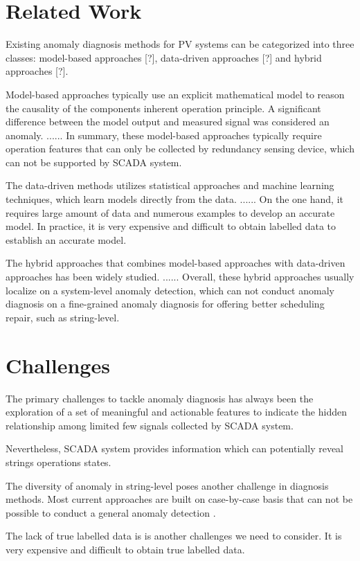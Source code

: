 \documentclass[journal]{IEEEtran}
\begin{document}
\section{Related Work}
\label{sctn:related}
Existing anomaly diagnosis methods for PV systems can be categorized into three classes: model-based approaches [?], data-driven approaches [?] and hybrid approaches [?].

Model-based approaches typically use an explicit mathematical model to reason the causality of the components inherent operation principle. A significant difference between the model output and measured signal was considered an anomaly. ...... In summary, these model-based approaches typically require operation features that can only be collected by redundancy sensing device, which can not be supported by SCADA system.

The data-driven methods utilizes statistical approaches and machine learning techniques, which learn models directly from the data. ...... On the one hand, it requires large amount of data and numerous examples to develop an accurate model. In practice, it is very expensive and difficult to obtain labelled data to establish an accurate model.

The hybrid approaches that combines model-based approaches with data-driven approaches has been widely studied. ...... Overall, these hybrid approaches usually localize on a system-level anomaly detection, which can not conduct anomaly diagnosis on a fine-grained anomaly diagnosis for offering better scheduling repair, such as string-level. 

\section{Challenges}
\label{sctn:chllngs}
The primary challenges to tackle anomaly diagnosis has always been the exploration of a set of meaningful and actionable features to indicate the hidden relationship among limited few signals collected by SCADA system.

Nevertheless, SCADA system provides information which can potentially reveal strings operations states.

The diversity of anomaly in string-level poses another challenge in diagnosis methods. Most current approaches are built on case-by-case basis that can not be possible to conduct a general anomaly detection .

The lack of true labelled data is is another challenges we need to consider. It is very expensive and difficult to obtain true labelled data.
\end{document}
